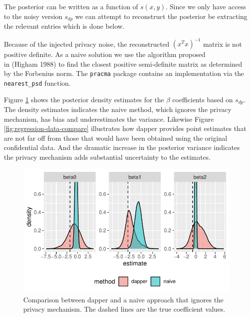 The posterior can be written as a function of \(s(x,y)\). Since
we only have access to the noisy version \(s_{dp}\) we can
attempt to reconstruct the posterior be extracting the
relevant entries which is done below.

Because of the injected privacy noise, the reconstructed
\((x^Tx)^{-1}\) matrix is not positive definite. As
a naive solution we use the algorithm proposed\\
in (Higham 1988) to find the closest positive semi-definite matrix
as determined by the Forbenius norm. The \texttt{pracma}
package contains an implementation via the \texttt{nearest\_psd}
function.

Figure \ref{fig:regression-compare} shows the posterior density estimates for the \(\beta\) coefficients based
on \(s_{dp}\). The density estimates indicates the naive method, which ignores the privacy mechanism, has bias and
underestimates the variance. Likewise Figure \ref{fig:regression-data-compare}
illustrates how dapper provides point estimates that are not far off from those
that would have been obtained using the original confidential data. And the dramatic
increase in the posterior variance indicates the privacy mechanism adds substantial
uncertainty to the estimates.

\begin{figure}

{\centering \includegraphics{dppaper_files/figure-latex/regression-compare-1} 

}

\caption{Comparison between dapper and a naive approach that ignores the privacy mechanism. The dashed lines
are the true coefficient values.}\label{fig:regression-compare}
\end{figure}

